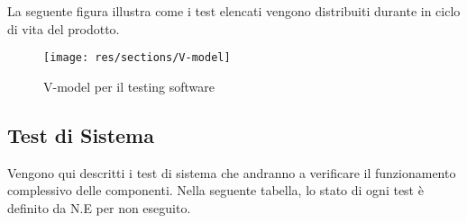 	La seguente figura illustra come i test elencati vengono distribuiti durante in ciclo di vita del prodotto.

	\begin{figure}[H]
		\centering
		\texttt{[image: res/sections/V-model]}
		\caption{V-model per il testing software}
	\end{figure}
	

\subsection{Test di Sistema}
	Vengono qui descritti i test di sistema che andranno a verificare il funzionamento complessivo delle componenti. Nella seguente tabella, lo stato di ogni test è definito da N.E per non eseguito.

	
	
	
	
	
